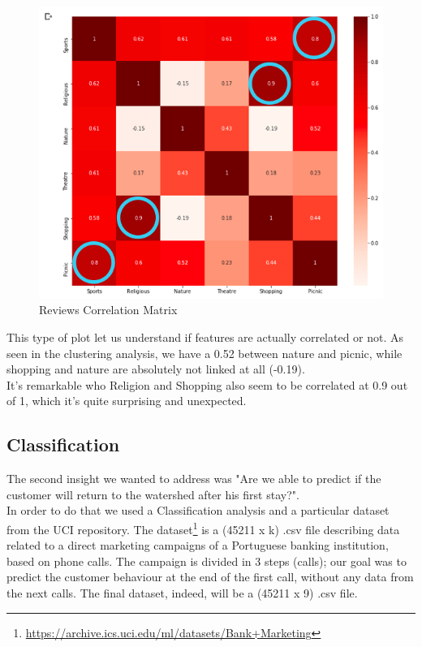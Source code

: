 \begin{figure}[H]
\centering
\includegraphics[width=1\textwidth]{Img/correlation_review.png}
\caption{Reviews Correlation Matrix}
\end{figure}

\noindent This type of plot let us understand if features are actually correlated or not. As seen in the clustering analysis, we have a 0.52 between nature and picnic, while shopping and nature are absolutely not linked at all (-0.19).\\
It's remarkable who Religion and Shopping also seem to be correlated at 0.9 out of 1, which it's quite surprising and unexpected.

\clearpage
\subsection{Classification}
The second insight we wanted to address was "Are we able to predict if the customer will return to the watershed after his first stay?".\\
In order to do that we used a Classification analysis and a particular dataset from the UCI repository. The dataset\footnote{\url{https://archive.ics.uci.edu/ml/datasets/Bank+Marketing}} is a (45211 x k) .csv file describing data related to a direct marketing campaigns of a Portuguese banking institution, based on phone calls. The campaign is divided in 3 steps (calls); our goal was to predict the customer behaviour at the end of the first call, without any data from the next calls. The final dataset, indeed, will be a (45211 x 9) .csv file.

